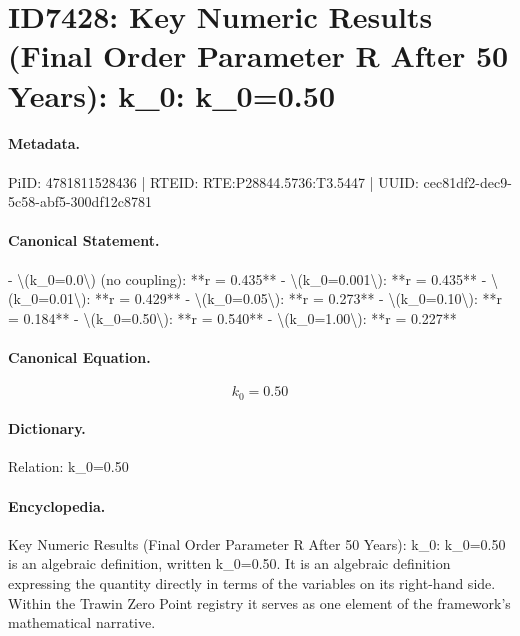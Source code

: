 \section*{ID7428: Key Numeric Results (Final Order Parameter R After 50 Years): k\_0: k\_0=0.50}
\paragraph{Metadata.}
PiID: 4781811528436 | RTEID: RTE:P28844.5736:T3.5447 | UUID: cec81df2-dec9-5c58-abf5-300df12c8781

\paragraph{Canonical Statement.}
- \textbackslash{}(k\_0=0.0\textbackslash{}) (no coupling): **r = 0.435** - \textbackslash{}(k\_0=0.001\textbackslash{}): **r = 0.435** - \textbackslash{}(k\_0=0.01\textbackslash{}): **r = 0.429** - \textbackslash{}(k\_0=0.05\textbackslash{}): **r = 0.273** - \textbackslash{}(k\_0=0.10\textbackslash{}): **r = 0.184** - \textbackslash{}(k\_0=0.50\textbackslash{}): **r = 0.540** - \textbackslash{}(k\_0=1.00\textbackslash{}): **r = 0.227**

\paragraph{Canonical Equation.}
\[
k_0=0.50
\]

\paragraph{Dictionary.}
Relation: k\_0=0.50

\paragraph{Encyclopedia.}
Key Numeric Results (Final Order Parameter R After 50 Years): k\_0: k\_0=0.50 is an algebraic definition, written k\_0=0.50. It is an algebraic definition expressing the quantity directly in terms of the variables on its right-hand side. Within the Trawin Zero Point registry it serves as one element of the framework's mathematical narrative.
